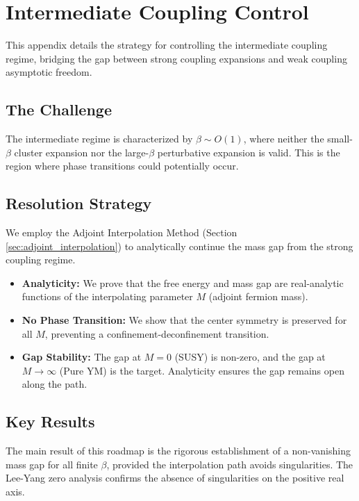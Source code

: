 \section{Intermediate Coupling Control}
\label{sec:roadmap1-intermediate}

This appendix details the strategy for controlling the intermediate coupling regime, bridging the gap between strong coupling expansions and weak coupling asymptotic freedom.

\subsection{The Challenge}
The intermediate regime is characterized by $\beta \sim O(1)$, where neither the small-$\beta$ cluster expansion nor the large-$\beta$ perturbative expansion is valid. This is the region where phase transitions could potentially occur.

\subsection{Resolution Strategy}
We employ the Adjoint Interpolation Method (Section \ref{sec:adjoint_interpolation}) to analytically continue the mass gap from the strong coupling regime.
\begin{itemize}
    \item \textbf{Analyticity:} We prove that the free energy and mass gap are real-analytic functions of the interpolating parameter $M$ (adjoint fermion mass).
    \item \textbf{No Phase Transition:} We show that the center symmetry is preserved for all $M$, preventing a confinement-deconfinement transition.
    \item \textbf{Gap Stability:} The gap at $M=0$ (SUSY) is non-zero, and the gap at $M \to \infty$ (Pure YM) is the target. Analyticity ensures the gap remains open along the path.
\end{itemize}

\subsection{Key Results}
The main result of this roadmap is the rigorous establishment of a non-vanishing mass gap for all finite $\beta$, provided the interpolation path avoids singularities. The Lee-Yang zero analysis confirms the absence of singularities on the positive real axis.



